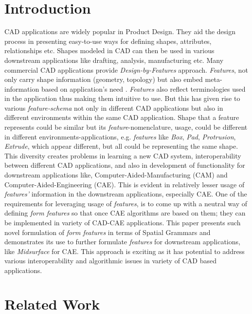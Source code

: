 
\section{Introduction}

CAD applications are widely popular in Product Design. They aid the design process in presenting easy-to-use ways for defining shapes, attributes, relationships etc. Shapes modeled in CAD can then be used in various downstream applications like drafting, analysis, manufacturing etc. Many commercial CAD applications provide {\em Design-by-Features} approach. {\em Features}, not only carry shape information (geometry, topology) but also embed meta-information based on application's need \cite{Brunetti2003}. {\em Features} also reflect terminologies used in the application thus making them intuitive to use. But this has given rise to various {\em feature-schema} not only in different CAD applications but also in different environments within the same CAD application. Shape that a feature represents could be similar but its {\em feature}-nomenclature, usage, could be different in different environments-applications, e.g. {\em features} like {\em Box}, {\em Pad}, {\em Protrusion}, {\em Extrude}, which appear different, but all could be representing the same shape. This diversity creates problems in learning a new CAD system, interoperability between different CAD applications, and also in development of functionality for downstream applications like, Computer-Aided-Manufacturing (CAM) and Computer-Aided-Engineering (CAE). This is evident in relatively lesser usage of {\em features'} information in the downstream applications, especially CAE.  One of the requirements for leveraging usage of {\em features}, is to come up with a neutral way of defining {\em form features} so that once CAE algorithms are based on them; they can be implemented in variety of CAD-CAE applications. This paper presents such novel formulation of {\em form features} in terms of Spatial Grammars and demonstrates its use to further formulate {\em features} for downstream applications, like {\em Midsurface} for CAE. This approach is exciting as it has potential to address various interoperability and algorithmic issues in variety of CAD based applications.

\section{Related Work}

